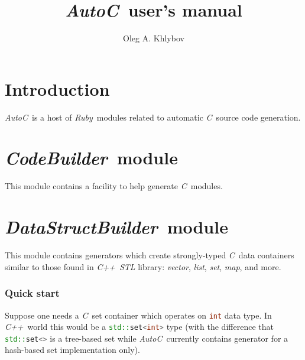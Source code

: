 \documentclass[a4paper]{article}
\newcommand{\autoc}{\emph{AutoC}}
\newcommand{\R}{\emph{Ruby}}
\newcommand{\C}{\emph{C}}
\newcommand{\Cpp}{\emph{C++}}
\begin{document}
\title{\autoc\ user's manual}
\author{Oleg A. Khlybov}


\maketitle


\part{Introduction}


\autoc\ is a host of \R\ modules related to automatic \C\ source code generation.


\newcommand{\codebuilder}{\emph{CodeBuilder}}
\part{\codebuilder\ module}


This module contains a facility to help generate \C\ modules.


\newcommand{\datastructbuilder}{\emph{DataStructBuilder}}
\part{\datastructbuilder\ module}


This module contains generators which create strongly-typed \C\ data containers similar to those found in \Cpp\ \emph{STL} library: \emph{vector}, \emph{list}, \emph{set}, \emph{map}, and more.


\section{Quick start}


Suppose one needs a \C\ set container which operates on \lstinline[language=C++]{int} data type.
In \Cpp\ world this would be a \lstinline[language=C++]{std::set<int>} type (with the difference that \lstinline[language=C++]{std::set<>} is a tree-based set while \autoc\ currently contains generator for a hash-based set implementation only).
\end{document}
